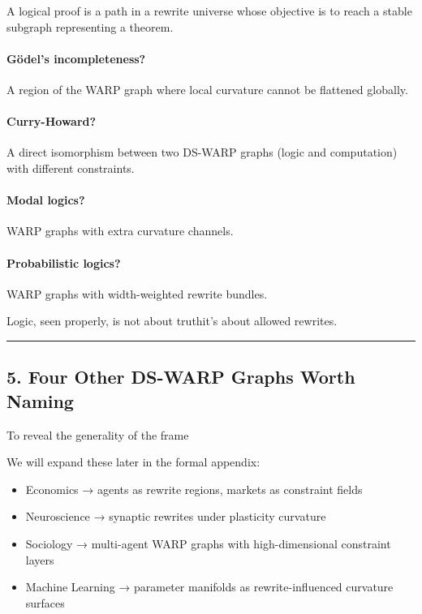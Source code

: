 A logical proof is a path in a rewrite universe whose objective is to
reach a stable subgraph representing a theorem.

\paragraph{Gödel's incompleteness?}\label{guxf6dels-incompleteness}

A region of the WARP graph where local curvature cannot be flattened globally.

\paragraph{Curry-Howard?}\label{curry-howard}

A direct isomorphism between two DS-WARP graphs (logic and computation) with
different constraints.

\paragraph{Modal logics?}\label{modal-logics}

WARP graphs with extra curvature channels.

\paragraph{Probabilistic logics?}\label{probabilistic-logics}

WARP graphs with width-weighted rewrite bundles.

Logic, seen properly, is not about truth\emd{}it's about allowed rewrites.

\begin{center}\rule{0.5\linewidth}{0.5pt}\end{center}

\subsection{5. Four Other DS-WARP Graphs Worth
Naming}\label{four-other-ds-rmgs-worth-naming}

To reveal the generality of the frame

We will expand these later in the formal appendix:

\begin{itemize}
\tightlist
\item
  Economics → agents as rewrite regions, markets as constraint fields
\item
  Neuroscience → synaptic rewrites under plasticity curvature
\item
  Sociology → multi-agent WARP graphs with high-dimensional constraint layers
\item
  Machine Learning → parameter manifolds as rewrite-influenced curvature
  surfaces
\end{itemize}

